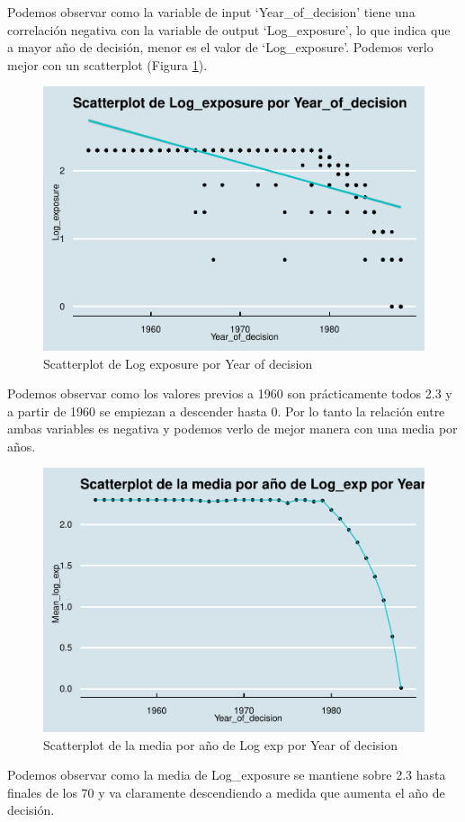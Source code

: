 \documentclass[
]{article}
\begin{document}
Podemos observar como la variable de input `Year\_of\_decision' tiene
una correlación negativa con la variable de output `Log\_exposure', lo
que indica que a mayor año de decisión, menor es el valor de
`Log\_exposure'. Podemos verlo mejor con un scatterplot (Figura
\ref{fig:sc_year_log}).

\begin{figure}

{\centering \includegraphics[width=0.5\linewidth]{anacalt-regresion_files/figure-latex/sc_year_log-1} 

}

\caption{Scatterplot de Log exposure por Year of decision}\label{fig:sc_year_log}
\end{figure}

Podemos observar como los valores previos a 1960 son prácticamente todos
2.3 y a partir de 1960 se empiezan a descender hasta 0. Por lo tanto la
relación entre ambas variables es negativa y podemos verlo de mejor
manera con una media por años.

\begin{figure}

{\centering \includegraphics[width=0.5\linewidth]{anacalt-regresion_files/figure-latex/unnamed-chunk-22-1} 

}

\caption{Scatterplot de la media por año de Log exp por Year of decision}\label{fig:unnamed-chunk-22}
\end{figure}

Podemos observar como la media de Log\_exposure se mantiene sobre 2.3
hasta finales de los 70 y va claramente descendiendo a medida que
aumenta el año de decisión.
\end{document}
